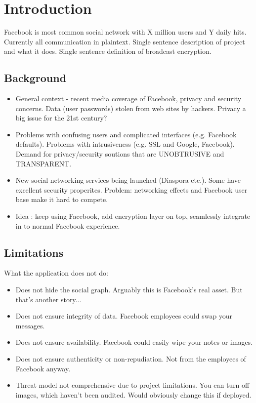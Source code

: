 \chapter{Introduction}\label{ch:introduction}

Facebook is most common social network with X million users and Y daily hits. Currently all communication in plaintext. Single sentence description of project and what it does. Single sentence definition of broadcast encryption.

\section{Background}

\begin{itemize}

    \item General context - recent media coverage of Facebook, privacy and security concerns. Data (user passwords) stolen from web sites by hackers. Privacy a big issue for the 21st century?
  
    \item Problems with confusing users and complicated interfaces (e.g. Facebook defaults). Problems with intrusiveness (e.g. SSL and Google, Facebook). Demand for privacy/security soutions that are UNOBTRUSIVE and TRANSPARENT.

    \item New social networking services being launched (Diaspora etc.). Some have excellent security properites. Problem: networking effects and Facebook user base make it hard to compete.
    
    \item Idea : keep using Facebook, add encryption layer on top, seamlessly integrate in to normal Facebook experience.
    
\end{itemize}

\section{Limitations}

What the application does not do:
\begin{itemize}
    \item Does not hide the social graph. Arguably this is Facebook's real asset. But that's another story...
    \item Does not ensure integrity of data. Facebook employees could swap your messages.
    \item Does not ensure availability. Facebook could easily wipe your notes or images.
    \item Does not ensure authenticity or non-repudiation. Not from the employees of Facebook anyway.
    \item Threat model not comprehensive due to project limitations. You can turn off images, which haven't been audited. Would obviously change this if deployed.
\end{itemize}


